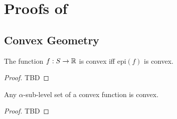
\chapter{Proofs of }

\section{Convex Geometry}

\begin{lem}\label{lem:b1}
The function $f : S \to \mathbb{R}$ is convex iff $\mathrm{epi}(f)$ is convex.
\end{lem}
\begin{proof} TBD
\end{proof}

\begin{lem}\label{lem:b2}
Any $\alpha$-sub-level set of a convex function is convex.
\end{lem}
\begin{proof} TBD
\end{proof}